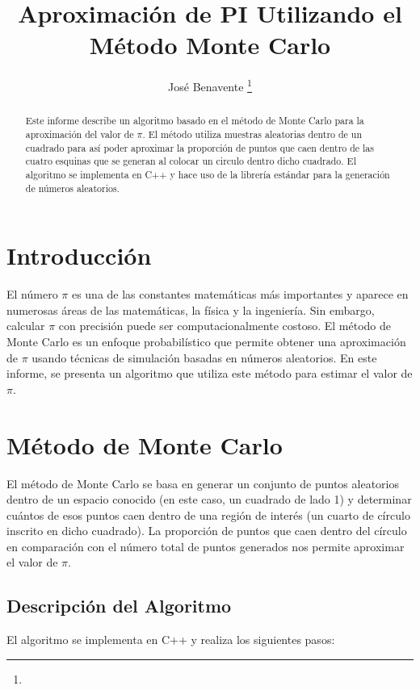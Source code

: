 \documentclass[a4paper, 10pt]{IEEEtran}
\begin{document}
\title{Aproximación de PI Utilizando el Método Monte Carlo}
\author{José Benavente
\thanks{}}
\maketitle

\maketitle

\begin{abstract}
Este informe describe un algoritmo basado en el método de Monte Carlo para la aproximación del valor de $\pi$. El método utiliza muestras aleatorias dentro de un cuadrado para así poder aproximar la proporción de puntos que caen dentro de las cuatro esquinas que se generan al colocar un circulo dentro dicho cuadrado. El algoritmo se implementa en C++ y hace uso de la librería estándar para la generación de números aleatorios.
\end{abstract}

\section{Introducción}
El número $\pi$ es una de las constantes matemáticas más importantes y aparece en numerosas áreas de las matemáticas, la física y la ingeniería. Sin embargo, calcular $\pi$ con precisión puede ser computacionalmente costoso. El método de Monte Carlo es un enfoque probabilístico que permite obtener una aproximación de $\pi$ usando técnicas de simulación basadas en números aleatorios. En este informe, se presenta un algoritmo que utiliza este método para estimar el valor de $\pi$.

\section{Método de Monte Carlo}
El método de Monte Carlo se basa en generar un conjunto de puntos aleatorios dentro de un espacio conocido (en este caso, un cuadrado de lado 1) y determinar cuántos de esos puntos caen dentro de una región de interés (un cuarto de círculo inscrito en dicho cuadrado). La proporción de puntos que caen dentro del círculo en comparación con el número total de puntos generados nos permite aproximar el valor de $\pi$.

\subsection{Descripción del Algoritmo}
El algoritmo se implementa en C++ y realiza los siguientes pasos:
\end{document}
